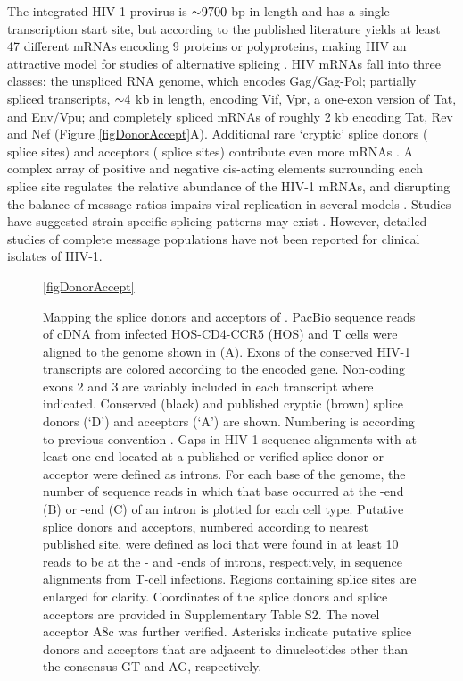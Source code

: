\documentclass[../sherrill-Mix_thesis.tex]{subfiles}
\begin{document}
The integrated HIV-1 provirus is $\mathord{\sim}{}9700$ bp in length and has a single transcription start site, but according to the published literature yields at least 47 different mRNAs encoding 9 proteins or polyproteins, making HIV an attractive model for studies of alternative splicing \citep{Purcell1993}. HIV mRNAs fall into three classes: the unspliced RNA genome, which encodes Gag/Gag-Pol; partially spliced transcripts, $\mathord{\sim}{}4$ kb in length, encoding Vif, Vpr, a one-exon version of Tat, and Env/Vpu; and completely spliced mRNAs of roughly 2 kb encoding Tat, Rev and Nef (Figure \ref{figDonorAccept}A). Additional rare `cryptic' splice donors (\fivePrime{} splice sites) and acceptors (\threePrime{} splice sites) contribute even more mRNAs \citep{Benko1990,Carrera2010,Luetzelberger2006,Salfeld1990,Schwartz1990,Smith1992}. A complex array of positive and negative cis-acting elements surrounding each splice site regulates the relative abundance of the HIV-1 mRNAs, and disrupting the balance of message ratios impairs viral replication in several models \citep{Stoltzfus2009,Bakkour2007,Brass2008,Jablonski2009,Konig2008,Tranell2011,Zhou2008,Zhu2011}. Studies have suggested strain-specific splicing patterns may exist \citep{Purcell1993,Saltarelli1996,Delgado2012}. However, detailed studies of complete message populations have not been reported for clinical isolates of HIV-1. 

\begin{figure}
	\centering
	\caption[Mapping the splice donors and acceptors of \hivEight{}]{Mapping the splice donors and acceptors of \hivEight{}. PacBio sequence reads of \hivEight{} cDNA from infected HOS-CD4-CCR5 (HOS) and \cdFour{} T cells were aligned to the \hivEight{} genome shown in (A). Exons of the conserved HIV-1 transcripts are colored according to the encoded gene. Non-coding exons 2 and 3 are variably included in each transcript where indicated. Conserved (black) and published cryptic (brown) splice donors (`D') and acceptors (`A') are shown. Numbering is according to previous convention \citep{Purcell1993}. Gaps in HIV-1 sequence alignments with at least one end located at a published or verified splice donor or acceptor were defined as introns. For each base of the \hivEight{} genome, the number of sequence reads in which that base occurred at the \fivePrime{}-end (B) or \threePrime{}-end (C) of an intron is plotted for each cell type. Putative splice donors and acceptors, numbered according to nearest published site, were defined as loci that were found in at least 10 reads to be at the \fivePrime{}- and \threePrime{}-ends of introns, respectively, in sequence alignments from T-cell infections. Regions containing splice sites are enlarged for clarity. Coordinates of the splice donors and splice acceptors are provided in Supplementary Table S2. The novel acceptor A8c was further verified. Asterisks indicate putative splice donors and acceptors that are adjacent to dinucleotides other than the consensus GT and AG, respectively.}
	\ref{figDonorAccept}
\end{figure}
\end{document}
